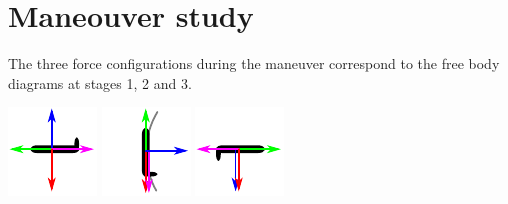 \section*{Maneouver study}
The three force configurations during the maneuver correspond to the free body diagrams at stages 1, 2 and 3.

	\includegraphics[width=0.3\linewidth]{figures/free-body-1.pdf}
	\label{fig:free-body-1}
		\includegraphics[width=0.3\linewidth]{figures/free-body-2.pdf}
	\label{fig:free-body-2}
		\includegraphics[width=0.3\linewidth]{figures/free-body-3.pdf}
	\label{fig:free-body-3}
